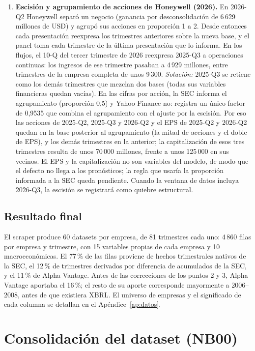 \documentclass[12pt,letterpaper,oneside]{report}
\renewcommand{\_}{\UnderscoreOriginal\allowbreak}
\begin{document}
\begin{enumerate}
  \item \textbf{Escisión y agrupamiento de acciones de Honeywell (2026).} En 2026-Q2 Honeywell separó un negocio (ganancia por desconsolidación de 6\,629 millones de USD) y agrupó sus acciones en proporción 1 a 2. Desde entonces cada presentación reexpresa los trimestres anteriores sobre la nueva base, y el panel toma cada trimestre de la última presentación que lo informa. En los flujos, el 10-Q del tercer trimestre de 2026 reexpresa 2025-Q3 a operaciones continuas: los ingresos de ese trimestre pasaban a 4\,929 millones, entre trimestres de la empresa completa de unos 9\,300. \emph{Solución:} 2025-Q3 se retiene como los demás trimestres que mezclan dos bases (todas sus variables financieras quedan vacías). En las cifras por acción, la SEC informa el agrupamiento (proporción 0,5) y Yahoo Finance no: registra un único factor de 0,9535 que combina el agrupamiento con el ajuste por la escisión. Por eso las acciones de 2025-Q2, 2025-Q3 y 2026-Q2 y el EPS de 2025-Q2 y 2026-Q2 quedan en la base posterior al agrupamiento (la mitad de acciones y el doble de EPS), y los demás trimestres en la anterior; la capitalización de esos tres trimestres resulta de unos 70\,000 millones, frente a unos 125\,000 en sus vecinos. El EPS y la capitalización no son variables del modelo, de modo que el defecto no llega a los pronósticos; la regla que usaría la proporción informada a la SEC queda pendiente. Cuando la ventana de datos incluya 2026-Q3, la escisión se registrará como quiebre estructural.
\end{enumerate}

\subsection{Resultado final}

El scraper produce 60 datasets por empresa, de 81 trimestres cada uno: 4\,860 filas por empresa y trimestre, con 15 variables propias de cada empresa y 10 macroeconómicas. El 77\,\% de las filas proviene de hechos trimestrales nativos de la SEC, el 12\,\% de trimestres derivados por diferencia de acumulados de la SEC, y el 11\,\% de Alpha Vantage. Antes de las correcciones de los puntos 2 y 3, Alpha Vantage aportaba el 16\,\%; el resto de su aporte corresponde mayormente a 2006--2008, antes de que existiera XBRL. El universo de empresas y el significado de cada columna se detallan en el Apéndice~\ref{ap:datos}.

\section{Consolidación del dataset (NB00)}
\label{sec:metodo-nb00}
\end{document}
